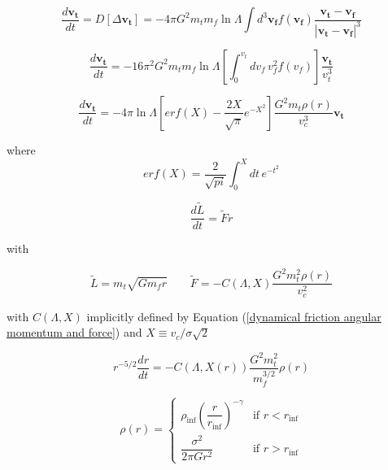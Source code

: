 \documentclass[12pt,twoside,openany]{book}
\begin{document}
\begin{equation}\label{velocity first order diffusion coefficient}
    \frac{d\mathbf{v_t}}{dt}=D[\Delta \mathbf{v_t}]=-4\pi G^2 m_t m_f\ln{\Lambda}\int d^3\mathbf{v_f}f(\mathbf{v_f})\frac{\mathbf{v_t}-\mathbf{v_f}}{|\mathbf{v_t}-\mathbf{v_f}|^3}
\end{equation}



\begin{equation}\label{Chandrasekhar dynamical friction equation}
    \frac{d\mathbf{v_t}}{dt}=-16\pi^2 G^2 m_t m_f\ln{\Lambda}\left[\int_{0}^{v_t}dv_f\, v_f^2 f(v_f)\right]\frac{\mathbf{v_t}}{v_t^3}
\end{equation}


\begin{equation}\label{Chandrasekhar dynamical friction equation for MB}
    \frac{d\mathbf{v_t}}{dt}=-4\pi \ln{\Lambda}\left[erf(X)-\frac{2X}{\sqrt{\pi}}e^{-X^2}\right]\frac{G^2m_t\rho(r)}{v_c^3}\mathbf{v_t}
\end{equation}


where 
\begin{equation}\label{error function}
    erf(X)=\frac{2}{\sqrt{pi}}\int_{0}^{X}dt \, e^{-t^2}
\end{equation}



\begin{equation}\label{dynamical friction angular momentum loss eq}
    \frac{d\tilde{L}}{dt}=\tilde{F}r
\end{equation}

with 

\begin{equation}\label{dynamical friction angular momentum and force}
    \tilde{L}=m_t\sqrt{Gm_fr}        \qquad  \tilde{F}=-C(\Lambda,X)\frac{G^2m_t^2\rho(r)}{v_c^2}
\end{equation}

with $C(\Lambda,X)$ implicitly defined by Equation (\ref{dynamical friction angular momentum and force})
and $X\equiv v_c/\sigma\sqrt{2}$

\begin{equation}\label{r(t) diff. eq. for dynamical friction}
    r^{-5/2}\frac{dr}{dt}=-C(\Lambda,X(r))\frac{G^2m_t^2}{m_f^{3/2}}\rho(r)
\end{equation}




\begin{equation}\label{SIS matched with stellar cusp}
\rho(r) =
\begin{cases}
\rho_{\mathrm{inf}}\left(\dfrac{r}{r_{\mathrm{inf}}}\right)^{-\gamma}
& \text{if } r < r_{\mathrm{inf}} \\[6pt]
\dfrac{\sigma^2}{2\pi G r^2}
& \text{if } r > r_{\mathrm{inf}}
\end{cases}
\end{equation}
\end{document}
